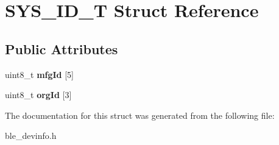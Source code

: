 \hypertarget{struct_s_y_s___i_d___t}{\section{S\-Y\-S\-\_\-\-I\-D\-\_\-\-T Struct Reference}
\label{struct_s_y_s___i_d___t}
}
\subsection*{Public Attributes}
\begin{DoxyCompactItemize}
\item 
\hypertarget{struct_s_y_s___i_d___t_a36a75b1bc4c8e4866eb039880b8aad9e}{uint8\-\_\-t {\bfseries mfg\-Id} \mbox{[}5\mbox{]}}\label{struct_s_y_s___i_d___t_a36a75b1bc4c8e4866eb039880b8aad9e}

\item 
\hypertarget{struct_s_y_s___i_d___t_aaf2c14195d90ec1c9de9b6c57c4fcd94}{uint8\-\_\-t {\bfseries org\-Id} \mbox{[}3\mbox{]}}\label{struct_s_y_s___i_d___t_aaf2c14195d90ec1c9de9b6c57c4fcd94}

\end{DoxyCompactItemize}


The documentation for this struct was generated from the following file\-:\begin{DoxyCompactItemize}
\item 
ble\-\_\-devinfo.\-h\end{DoxyCompactItemize}
